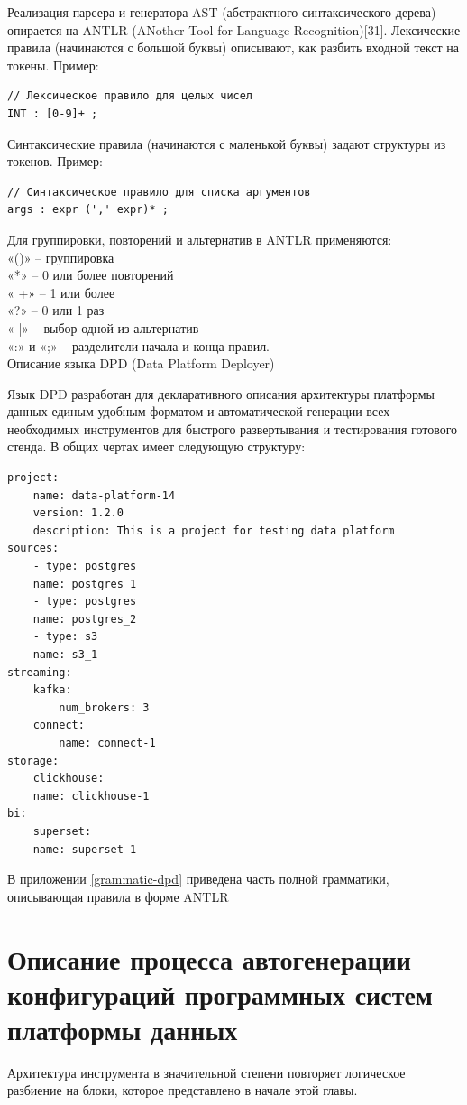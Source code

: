 Реализация парсера и генератора AST (абстрактного синтаксического дерева) опирается на ANTLR (ANother Tool for Language Recognition)[31].
Лексические правила (начинаются с большой буквы) описывают, как разбить входной текст на токены.
Пример:\\
\begin{verbatim}
// Лексическое правило для целых чисел
INT : [0-9]+ ; 
\end{verbatim}
Синтаксические правила (начинаются с маленькой буквы) задают структуры из токенов.
Пример:
\begin{verbatim}
// Синтаксическое правило для списка аргументов
args : expr (',' expr)* ; 
\end{verbatim}
Для группировки, повторений и альтернатив в ANTLR применяются:\\
«()» – группировка\\
«*» – 0 или более повторений\\
« +» – 1 или более\\
«?» – 0 или 1 раз\\
« |» – выбор одной из альтернатив\\
«:» и «;» – разделители начала и конца правил.\\

Описание языка DPD (Data Platform Deployer)

Язык DPD  разработан для  декларативного описания архитектуры платформы данных единым удобным форматом и автоматической генерации всех необходимых инструментов для быстрого развертывания и тестирования готового стенда. В общих чертах имеет следующую структуру:
\begin{verbatim}
project:
    name: data-platform-14
    version: 1.2.0
    description: This is a project for testing data platform
sources:
    - type: postgres
    name: postgres_1
    - type: postgres
    name: postgres_2
    - type: s3
    name: s3_1
streaming:
    kafka:
        num_brokers: 3
    connect:
        name: connect-1
storage:
    clickhouse:
    name: clickhouse-1
bi:
    superset:
    name: superset-1
\end{verbatim}
В приложении \ref{grammatic-dpd}  приведена часть полной грамматики, описывающая правила в форме ANTLR \\





\section{Описание процесса автогенерации конфигураций программных систем платформы данных} \label{ch3:process_generation}
Архитектура инструмента в значительной степени повторяет логическое разбиение на блоки, которое представлено в начале этой главы.

